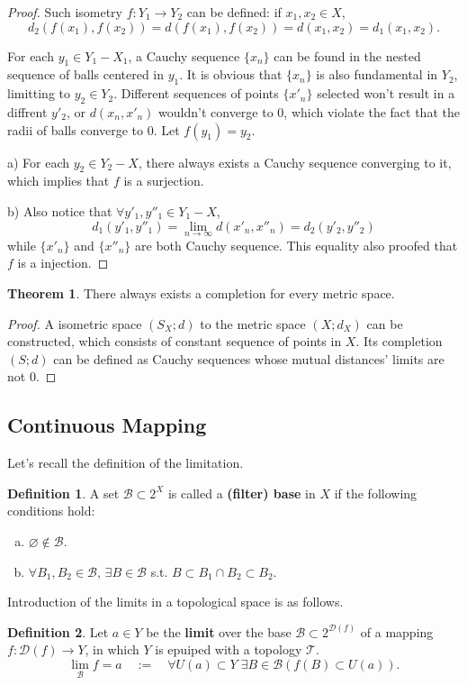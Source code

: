 \documentclass{article}
\theoremstyle{plain}
\theoremstyle{definition}
\newtheorem{dfn}{Definition}[section] %
\newtheorem{thrm}{Theorem}[section] %
\begin{document}
\begin{proof}
Such isometry $f:Y_1\to Y_2$ can be defined: if $x_1,x_2\in X$, 
\[
	d_2( f(x_1) , f(x_2) )=d(f(x_1), f(x_2)) = d(x_1 , x_2)=d_1(x_1, x_2).
\]

For each $y_1\in Y_1 - X_1$, a Cauchy sequence $\{x_n\}$ can be found in the nested sequence of balls centered in $y_1$. It is obvious that $\{x_n\}$ is also fundamental in $Y_2$, limitting to $y_2\in Y_2$. Different sequences of points $\{x'_n\}$ selected won't result in a diffrent $y'_2$, or $d(x_n,x'_n)$ wouldn't converge to $0$, which violate the fact that the radii of balls converge to $0$. Let $f(y_1)=y_2$. 

a) For each $y_2\in Y_2 - X$, there always exists a Cauchy sequence converging to it, which implies that $f$ is a surjection.

b) Also notice that $\forall y'_1,y''_1\in Y_1 - X$,
\[
	d_1(y'_1,y''_1)= \lim_{n\to\infty} d(x'_n,x''_n)=d_2(y'_2,y''_2)
\]
while $\{x'_n\}$ and $\{x''_n\}$ are both Cauchy sequence. This equality also proofed that $f$ is a injection.
\end{proof}
\begin{thrm}\label{completion_exists}
There always exists a completion for every metric space.
\end{thrm}
\begin{proof}
	A isometric space $(S_X;d)$ to the metric space $(X;d_X)$ can be constructed, which consists of constant sequence of points in $X$. Its completion $(S;d)$ can be defined as Cauchy sequences whose mutual distances' limits are not $0$.
\end{proof}
\subsection{Continuous Mapping}
Let's recall the definition of the limitation.
\begin{dfn}\label{filter_base}
A set $\mathscr{B}\subset 2^X$ is called a \textbf{(filter) base} in $X$ if the following conditions hold:
\begin{enumerate}[a)]
\item $\varnothing \notin \mathscr{B}$.
\item $\forall B_1,B_2\in \mathscr{B}$, $\exists B\in \mathscr{B}$ s.t. $B\subset B_1\cap B_2\subset B_2$. 
\end{enumerate}
\end{dfn}
Introduction of the limits in a topological space is as follows.
\begin{dfn}\label{limit}
Let $a\in Y$ be the \textbf{limit} over the base $\mathscr{B}\subset 2^{\mathscr{D}(f)}$ of a mapping $f:\mathscr{D}( f )\to Y$, in which $Y$ is epuiped with a topology $\mathscr{T}$. 
\[
	\lim_\mathscr{B} f = a 
	\quad:=\quad
	\forall U(a)\subset Y\;
	\exists B\in \mathscr{B}(f(B)\subset U(a)).
\]
\end{dfn}
\end{document}
